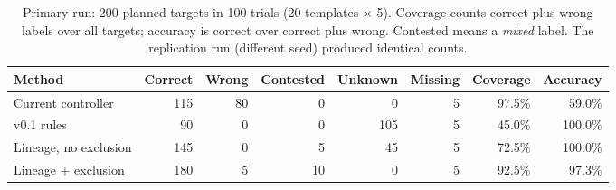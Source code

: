 \begin{table}[tb]
\centering\small
\setlength{\tabcolsep}{5pt}
\begin{tabular}{@{}lrrrrrrr@{}}
\toprule
Method & Correct & Wrong & Contested & Unknown & Missing & Coverage & Accuracy \\
\midrule
Current controller & 115 & 80 & 0 & 0 & 5 & 97.5\% & 59.0\% \\
v0.1 rules & 90 & 0 & 0 & 105 & 5 & 45.0\% & 100.0\% \\
Lineage, no exclusion & 145 & 0 & 5 & 45 & 5 & 72.5\% & 100.0\% \\
Lineage + exclusion & 180 & 5 & 10 & 0 & 5 & 92.5\% & 97.3\% \\
\bottomrule
\end{tabular}
\caption{Primary run: 200 planned targets in 100 trials (20 templates $\times$ 5). Coverage counts correct plus wrong labels over all targets; accuracy is correct over correct plus wrong. Contested means a \emph{mixed} label. The replication run (different seed) produced identical counts.}
\label{tab:attribution}
\end{table}
